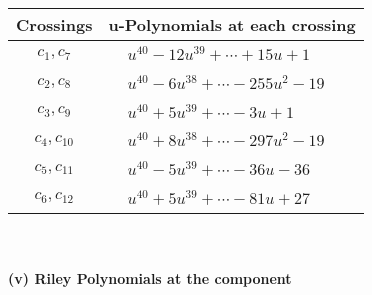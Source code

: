 \documentclass[1p]{elsarticle_modified}
\theoremstyle{definition}
\begin{document}
\begin{tabular}{m{50pt}|m{274pt}}
Crossings & \hspace{64pt}u-Polynomials at each crossing \\
\hline $$\begin{aligned}c_{1},c_{7}\end{aligned}$$&$\begin{aligned}
&u^{40}-12 u^{39}+\cdots+15 u+1
\end{aligned}$\\
\hline $$\begin{aligned}c_{2},c_{8}\end{aligned}$$&$\begin{aligned}
&u^{40}-6 u^{38}+\cdots-255 u^2-19
\end{aligned}$\\
\hline $$\begin{aligned}c_{3},c_{9}\end{aligned}$$&$\begin{aligned}
&u^{40}+5 u^{39}+\cdots-3 u+1
\end{aligned}$\\
\hline $$\begin{aligned}c_{4},c_{10}\end{aligned}$$&$\begin{aligned}
&u^{40}+8 u^{38}+\cdots-297 u^2-19
\end{aligned}$\\
\hline $$\begin{aligned}c_{5},c_{11}\end{aligned}$$&$\begin{aligned}
&u^{40}-5 u^{39}+\cdots-36 u-36
\end{aligned}$\\
\hline $$\begin{aligned}c_{6},c_{12}\end{aligned}$$&$\begin{aligned}
&u^{40}+5 u^{39}+\cdots-81 u+27
\end{aligned}$\\
\hline
\end{tabular}\\~\\
\newpage\renewcommand{\arraystretch}{1}
\flushleft \textbf{(v) Riley Polynomials at the component}\newline \\
\end{document}
